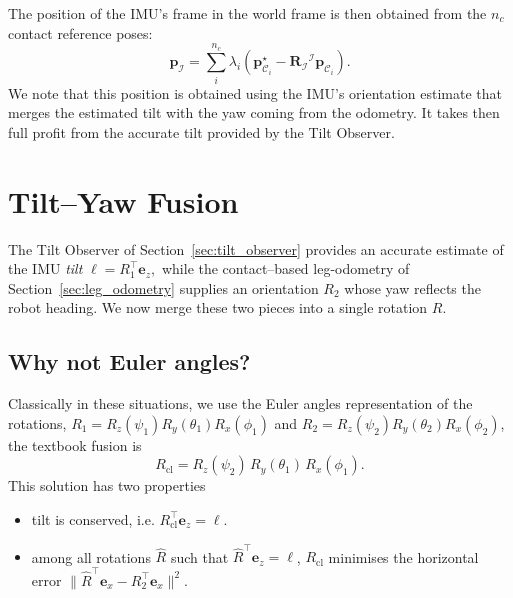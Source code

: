 \documentclass{IJCAS}
\begin{document}
The position of the IMU's frame in the world frame is then obtained from the $n_{c}$ contact reference poses: 
\begin{equation}
    \boldsymbol{p}_{\mathcal{I}} = \sum^{n_{c}}_{i} \lambda_{i} \left( \boldsymbol{p}^{\star}_{{\mathcal{C}}_{i}} - \boldsymbol{R}_{\mathcal{I}} {}^{\mathcal{I}}\boldsymbol{p}_{{\mathcal{C}}_{i}} \right).
\end{equation}
We note that this position is obtained using the IMU's orientation estimate that merges the estimated tilt with the yaw coming from the odometry. It takes then full profit from the accurate tilt provided by the Tilt Observer.


\section{Tilt--Yaw Fusion}
\label{sec:axisAgnostic}

The Tilt Observer of Section~\ref{sec:tilt_observer} provides an accurate
estimate of the IMU \emph{tilt}
\(
  \boldsymbol{\ell}=R_{1}^{\top}\boldsymbol{e}_{z},
\)
while the contact–based leg-odometry of
Section~\ref{sec:leg_odometry} supplies an orientation \(R_{2}\) whose
yaw reflects the robot heading.  We now merge these two pieces into a
single rotation \(R\).

\subsection{Why not Euler angles?}

Classically in these situations, we use the Euler angles representation of the rotations,
\(R_{1}=R_{z}(\psi_{1})R_{y}(\theta_{1})R_{x}(\phi_{1})\) and
\(R_{2}=R_{z}(\psi_{2})R_{y}(\theta_{2})R_{x}(\phi_{2})\),
the textbook fusion is
\begin{equation}
  R_{\mathrm{cl}}
  =R_{z}(\psi_{2})\,R_{y}(\theta_{1})\,R_{x}(\phi_{1}).
  \label{eq:fusion_classic}
\end{equation}
This solution has two properties
\begin{itemize}
\item tilt is conserved, i.e. 
\(R_{\mathrm{cl}}^{\top}\boldsymbol{e}_{z}=\boldsymbol{\ell}\).
\item among all rotations \(\hat{R}\) such that
\(\hat{R}^{\top}\boldsymbol{e}_{z}=\boldsymbol{\ell}\),
\(R_{\mathrm{cl}}\) minimises the horizontal error
\(
  \|
    \hat{R}^{\top}\boldsymbol{e}_{x}-R_{2}^{\top}\boldsymbol{e}_{x}
  \|^{2}.
\)
\end{itemize}
\end{document}
